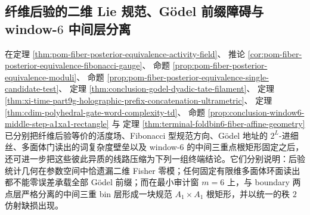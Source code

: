 \subsection{纤维后验的二维 Lie 规范、Gödel 前缀障碍与 window-\texorpdfstring{$6$}{6} 中间层分离}\label{subsec:conclusion-posterior-godel-window6-middle-layer-rigidity}

在定理 \ref{thm:pom-fiber-posterior-equivalence-activity-field}、
推论 \ref{cor:pom-fiber-posterior-equivalence-fibonacci-gauge}、
命题 \ref{prop:pom-fiber-posterior-equivalence-moduli}、
命题 \ref{prop:pom-fiber-posterior-equivalence-single-candidate-test}、
定理 \ref{thm:conclusion-godel-dyadic-tate-filament}、
定理 \ref{thm:xi-time-part9g-holographic-prefix-concatenation-ultrametric}、
定理 \ref{thm:cdim-polyhedral-gate-word-complexity-td}、
命题 \ref{prop:conclusion-window6-middle-step-a1xa1-rectangle} 与
定理 \ref{thm:terminal-foldbin6-fiber-affine-geometry} 已分别把纤维后验等价的活度场、Fibonacci 型规范方向、Gödel 地址的 \(2^L\)-进细丝、多面体门读出的词复杂度壁垒以及 window-\(6\) 的中间三重点根矩形固定之后，还可进一步把这些彼此异质的线路压缩为下列一组终端结论。它们分别说明：后验统计几何在参数空间中恰遗漏二维 Fisher 零模；任何固定有限维多面体环面读出都不能零误差承载全部 Gödel 前缀；而在最小审计窗 \(m=6\) 上，与 boundary 两点层严格分离的中间三重 bin 层形成一块规范 \(A_1\times A_1\) 根矩形，并以统一的秩 \(2\) 仿射缺损出现。

